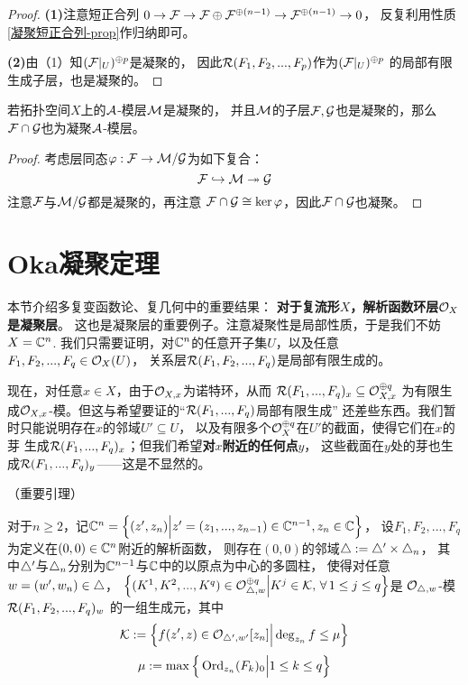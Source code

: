 \begin{proof}
\textbf{(1)}注意短正合列
$0\to\mathcal{F}\to\mathcal{F}\oplus\mathcal{F}^{\oplus(n-1)}\to\mathcal{F}^{\oplus(n-1)}\to 0$，
反复利用性质\ref{凝聚短正合列-prop}作归纳即可。

\textbf{(2)}由（1）知$(\mathcal{F}|_U)^{\oplus p}$是凝聚的，
因此$\mathcal{R}(F_1,F_2,...,F_p)$作为$(\mathcal{F}|_U)^{\oplus p}$
的局部有限生成子层，也是凝聚的。
\end{proof}

\begin{cor}若拓扑空间$X$上的$\mathcal{A}$-模层$\mathcal{M}$是凝聚的，
并且$\mathcal{M}$的子层$\mathcal{F},\mathcal{G}$也是凝聚的，那么
$\mathcal{F}\cap\mathcal{G}$也为凝聚$\mathcal{A}$-模层。
\end{cor}

\begin{proof}
考虑层同态$\varphi:\mathcal{F}\to\mathcal{M}/\mathcal{G}$为如下复合：
$$\mathcal{F}\hookrightarrow\mathcal{M}\twoheadrightarrow\mathcal{G}$$
注意$\mathcal{F}$与$\mathcal{M}/\mathcal{G}$都是凝聚的，再注意
$
  \mathcal{F}\cap\mathcal{G}\cong\ker\varphi
$，因此$\mathcal{F}\cap\mathcal{G}$也凝聚。
\end{proof}

\section{Oka凝聚定理}
本节介绍多复变函数论、复几何中的重要结果：
\textbf{对于复流形$X$，解析函数环层$\mathcal{O}_X$是凝聚层}。
这也是凝聚层的重要例子。注意凝聚性是局部性质，于是我们不妨$X=\mathbb{C}^n$.
我们只需要证明，对$\mathbb{C}^n$的任意开子集$U$，以及任意
$F_1,F_2,...,F_q\in\mathcal{O}_X(U)$，
关系层$\mathcal{R}(F_1,F_2,...,F_q)$是局部有限生成的。

现在，对任意$x\in X$，由于$\mathcal{O}_{X,x}$为诺特环，从而
$\mathcal{R}(F_1,...,F_q)_x\subseteq\mathcal{O}_{X,x}^{\oplus q}$
为有限生成$\mathcal{O}_{X,x}$-模。但这与希望要证的“$\mathcal{R}(F_1,...,F_q)$局部有限生成”
还差些东西。我们暂时只能说明存在$x$的邻域$U'\subseteq U$，
以及有限多个$\mathcal{O}_X^{\oplus q}$在$U'$的截面，使得它们在$x$的芽
生成$\mathcal{R}(F_1,...,F_q)_x$；但我们希望\textbf{对$x$附近的任何点$y$}，
这些截面在$y$处的芽也生成$\mathcal{R}(F_1,...,F_q)_y$——这是不显然的。

\begin{lemma}（重要引理）
\label{Oka凝聚-重要引理-lem}

对于$n\geq 2$，记$\mathbb{C}^n=\Big\{ (z',z_n) \Big| z'=(z_1,...,z_{n-1})\in\mathbb{C}^{n-1},z_n\in\mathbb{C} \Big\}$，
设$F_1,F_2,...,F_q$为定义在$(0,0)\in\mathbb{C}^n$附近的解析函数，
则存在$(0,0)$的邻域$\triangle:=\triangle'\times\triangle_n$，
其中$\triangle'$与$\triangle_n$分别为$\mathbb{C}^{n-1}$与$\mathbb{C}$中的以原点为中心的多圆柱，
使得对任意$w=(w',w_n)\in\triangle$，
$
  \Big\{ 
           (K^1,K^2,...,K^q)
           \in\mathcal{O}_{\triangle,w}^{\oplus q}
          \Big| K^j\in\mathcal{K},\,\forall\,1\leq j\leq q \Big\}
$是
$\mathcal{O}_{\triangle,w}$-模$\mathcal{R}(F_1,F_2,...,F_q)_w$
的一组生成元，其中
$$\mathcal{K}:=\Big\{ f(z',z)\in\mathcal{O}_{\triangle',w'}[z_n] \Big| \deg_{z_n}f\leq\mu \Big\}$$
$$
  \mu:=
  \max\Big\{ \operatorname{Ord}_{z_n}(F_{k})_0 \Big| 1\leq k\leq q \Big\}
$$
\end{lemma}

